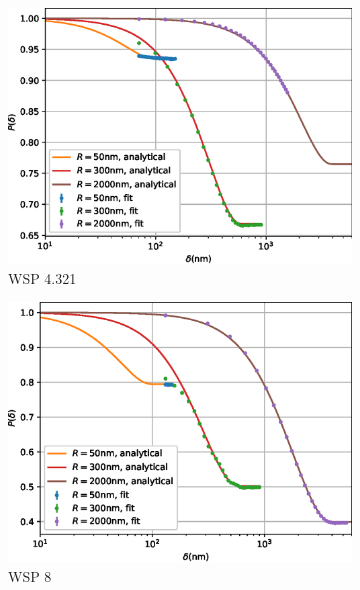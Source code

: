 \documentclass{article}
\begin{document}
\begin{figure}[p]
\begin{subfigure}[b]{0.45\textwidth}
		\includegraphics[width=\textwidth]{simulation-plot-WSP-4.321}
		\caption{WSP 4.321}
		\label{fig:simulation-plot-WSP-4.321}
	\end{subfigure}
	\hfill
	\begin{subfigure}[b]{0.45\textwidth}
		\centering
		\includegraphics[width=\textwidth]{simulation-plot-WSP-8}
		\caption{WSP 8}
		\label{fig:simulation-plot-WSP-8}
	\end{subfigure}
	\centering
	\begin{subfigure}[b]{0.45\textwidth}
		\centering

\end{subfigure}
\end{figure}
\end{document}
